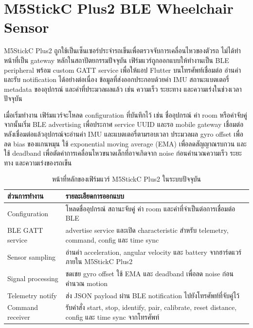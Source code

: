 \section{M5StickC Plus2 BLE Wheelchair Sensor}
\label{sec:ch3_wheelchair_sensor}
M5StickC Plus2 ถูกใช้เป็นเซ็นเซอร์ประจำรถเข็นเพื่อตรวจจับการเคลื่อนไหวของตัวรถ ไม่ได้ทำหน้าที่เป็น gateway หลักในสถาปัตยกรรมปัจจุบัน เฟิร์มแวร์ถูกออกแบบให้ทำงานเป็น BLE peripheral พร้อม custom GATT service เพื่อให้แอป Flutter บนโทรศัพท์เชื่อมต่อ อ่านค่า และรับ notification ได้อย่างต่อเนื่อง ข้อมูลที่ส่งออกประกอบด้วยค่า IMU สถานะแบตเตอรี่ metadata ของอุปกรณ์ และค่าที่ประมวลผลแล้ว เช่น ความเร็ว ระยะทาง และความเร่งในช่วงเวลาปัจจุบัน

เมื่อเริ่มทำงาน เฟิร์มแวร์จะโหลด configuration ที่บันทึกไว้ เช่น ชื่ออุปกรณ์ ค่า room หรือค่าจับคู่ จากนั้นเริ่ม BLE advertising เพื่อประกาศ service UUID และรอ mobile gateway เชื่อมต่อ หลังเชื่อมต่อแล้วอุปกรณ์จะอ่านค่า IMU และแบตเตอรี่ตามรอบเวลา ประมวลผล gyro offset เพื่อลด bias ของแกนหมุน ใช้ exponential moving average (EMA) เพื่อลดสัญญาณรบกวน และใช้ deadband เพื่อตัดค่าการเคลื่อนไหวขนาดเล็กที่อาจเกิดจาก noise ก่อนคำนวณความเร็ว ระยะทาง และความเร่งของรถเข็น

\begin{table}[H]
    \centering
    \caption{หน้าที่หลักของเฟิร์มแวร์ M5StickC Plus2 ในระบบปัจจุบัน}
    \label{tab:ch3_m5_hw}
    \small
    \renewcommand{\arraystretch}{1.25}
    \begin{tabular}{|L{4.0cm}|L{8.6cm}|}
        \hline
        \textbf{ส่วนการทำงาน} & \textbf{รายละเอียดการออกแบบ} \\ \hline
        Configuration & โหลดชื่ออุปกรณ์ สถานะจับคู่ ค่า room และค่าที่จำเป็นต่อการเชื่อมต่อ BLE \\ \hline
        BLE GATT service & advertise service และเปิด characteristic สำหรับ telemetry, command, config และ time sync \\ \hline
        Sensor sampling & อ่านค่า acceleration, angular velocity และ battery จากฮาร์ดแวร์ภายใน M5StickC Plus2 \\ \hline
        Signal processing & ชดเชย gyro offset ใช้ EMA และ deadband เพื่อลด noise ก่อนคำนวณ motion \\ \hline
        Telemetry notify & ส่ง JSON payload ผ่าน BLE notification ไปยังโทรศัพท์ที่จับคู่ไว้ \\ \hline
        Command receiver & รับคำสั่ง start, stop, identify, pair, calibrate, reset distance, config และ time sync จากโทรศัพท์ \\ \hline
    \end{tabular}
\end{table}

